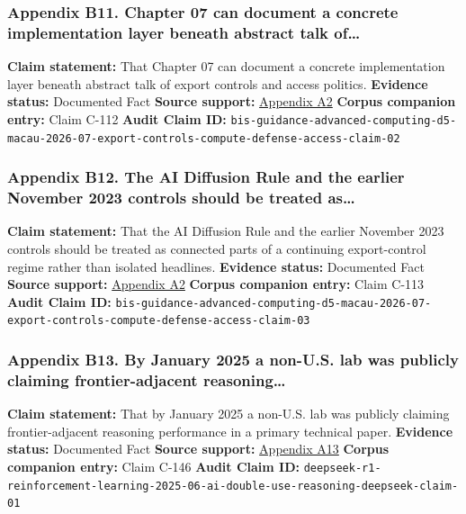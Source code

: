 \documentclass[
  american,
  11pt,
  letterpaper,
]{article}
\begin{document}
\subsubsection{Appendix B11. Chapter 07 can document a concrete
implementation layer beneath abstract talk
of\ldots{}}\label{ch-07-appendix-b11-chapter-07-can-document-a-concrete-implementation-layer-beneath-abstract-talk-of}

\textbf{Claim statement:} That Chapter 07 can document a concrete
implementation layer beneath abstract talk of export controls and access
politics. \textbf{Evidence status:} Documented Fact \textbf{Source
support:}
\hyperref[ch-07-appendix-a2-guidance-regarding-enforcement-of-license-requirements-for-advanced-computing-items-for-entities-headquartered-in-country-group-d-5-and-macau]{Appendix
A2} \textbf{Corpus companion entry:} Claim C-112 \textbf{Audit Claim
ID:}
\texttt{bis-guidance-advanced-computing-d5-macau-2026-07-export-controls-compute-defense-access-claim-02}

\subsubsection{Appendix B12. The AI Diffusion Rule and the earlier
November 2023 controls should be treated
as\ldots{}}\label{ch-07-appendix-b12-the-ai-diffusion-rule-and-the-earlier-november-2023-controls-should-be-treated-as}

\textbf{Claim statement:} That the AI Diffusion Rule and the earlier
November 2023 controls should be treated as connected parts of a
continuing export-control regime rather than isolated headlines.
\textbf{Evidence status:} Documented Fact \textbf{Source support:}
\hyperref[ch-07-appendix-a2-guidance-regarding-enforcement-of-license-requirements-for-advanced-computing-items-for-entities-headquartered-in-country-group-d-5-and-macau]{Appendix
A2} \textbf{Corpus companion entry:} Claim C-113 \textbf{Audit Claim
ID:}
\texttt{bis-guidance-advanced-computing-d5-macau-2026-07-export-controls-compute-defense-access-claim-03}

\subsubsection{Appendix B13. By January 2025 a non-U.S. lab was publicly
claiming frontier-adjacent
reasoning\ldots{}}\label{ch-07-appendix-b13-by-january-2025-a-non-u-s-lab-was-publicly-claiming-frontier-adjacent-reasoning}

\textbf{Claim statement:} That by January 2025 a non-U.S. lab was
publicly claiming frontier-adjacent reasoning performance in a primary
technical paper. \textbf{Evidence status:} Documented Fact
\textbf{Source support:}
\hyperref[ch-07-appendix-a13-deepseek-r1-incentivizing-reasoning-capability-in-llms-via-reinforcement-learning]{Appendix
A13} \textbf{Corpus companion entry:} Claim C-146 \textbf{Audit Claim
ID:}
\texttt{deepseek-r1-reinforcement-learning-2025-06-ai-double-use-reasoning-deepseek-claim-01}
\end{document}
